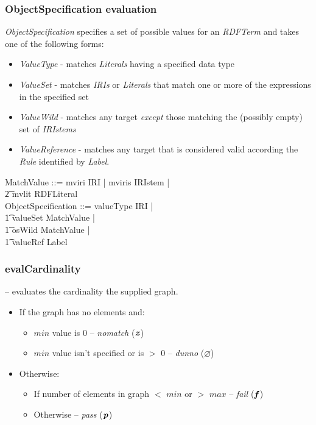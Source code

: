 \documentclass[fuzz]{llncs}
\def\pass{\textbf{\textit{p}}}
\def\fail{\textbf{\textit{f}}}
\def\dunno{\varnothing}
\def\nomatch{\textbf{\textit{z}}}
\def\zc{\textit}
\begin{document}
\subsubsection{ObjectSpecification evaluation}
\zc{ObjectSpecification} specifies a set of possible values for an \zc{RDFTerm} and takes one of the following forms:
\begin{itemize}
\item \zc{ValueType} - matches \zc{Literals} having a specified data type
\item \zc{ValueSet} - matches \zc{IRIs} or \zc{Literals} that match one or more of the expressions in the specified set
\item \zc{ValueWild} - matches any target \emph{except} those matching the (possibly empty) set of \zc{IRIstems}
\item \zc{ValueReference} - matches any target that is considered valid according the \zc{Rule} identified by \zc{Label}.
\end{itemize}
\begin{zed}
MatchValue ::= mviri \ldata IRI \rdata | mviris \ldata IRIstem \rdata | \\
\t2 mvlit \ldata RDFLiteral \rdata \\
ObjectSpecification ::= valueType \ldata IRI \rdata | \\
\t1 valueSet \ldata \power MatchValue \rdata | \\
\t1 osWild \ldata \power MatchValue \rdata | \\
\t1 valueRef \ldata Label \rdata
\end{zed}

\subsubsection{evalCardinality} -- evaluates the cardinality the supplied graph. 
\begin{itemize}
\item If the graph has no elements and:
\begin{itemize}
\item $min$ value is 0 -- \zc{nomatch} ($\nomatch$)
\item $min$ value isn't specified or is $>$ 0 -- \zc{dunno} ($\dunno$)
\end{itemize}
\item Otherwise:
\begin{itemize}
\item If number of elements in graph $<$ $min$ or $>$ $max$ -- \zc{fail} ($\fail$)
\item Otherwise -- \zc{pass} ($\pass$)
\end{itemize}
\end{itemize}
\end{document}
